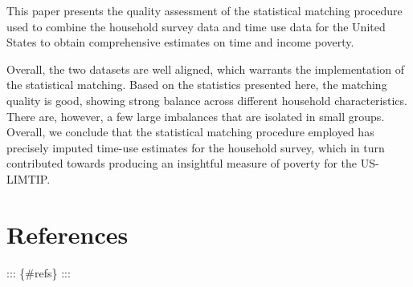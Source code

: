 \documentclass[
  11pt,
]{article}
\begin{document}
This paper presents the quality assessment of the statistical matching
procedure used to combine the household survey data and time use data
for the United States to obtain comprehensive estimates on time and
income poverty.

Overall, the two datasets are well aligned, which warrants the
implementation of the statistical matching. Based on the statistics
presented here, the matching quality is good, showing strong balance
across different household characteristics. There are, however, a few
large imbalances that are isolated in small groups. Overall, we conclude
that the statistical matching procedure employed has precisely imputed
time-use estimates for the household survey, which in turn contributed
towards producing an insightful measure of poverty for the US-LIMTIP.

\section*{References}\label{references}

::: \{\#refs\} :::
\end{document}

